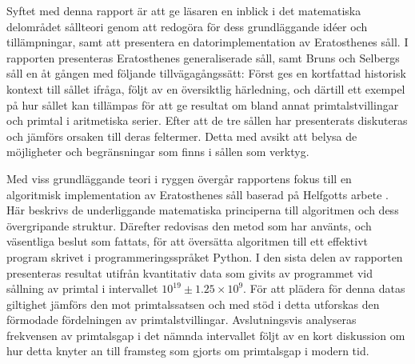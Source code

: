 Syftet med denna rapport är att ge läsaren en inblick i det matematiska delområdet sållteori genom att redogöra för dess grundläggande idéer och tillämpningar,
samt att presentera en datorimplementation av Eratosthenes såll.
%
I rapporten presenteras Eratosthenes generaliserade såll,
samt Bruns och Selbergs såll en åt gången med följande tillvägagångssätt:
Först ges en kortfattad historisk kontext till sållet ifråga,
följt av en översiktlig härledning,
och därtill ett exempel på hur sållet kan tillämpas
för att ge resultat om bland annat primtalstvillingar och primtal i aritmetiska serier.
%
Efter att de tre sållen har presenterats diskuteras och jämförs orsaken till deras feltermer.
Detta med avsikt att belysa de möjligheter och begränsningar som finns i sållen som verktyg.
%

%
Med viss grundläggande teori i ryggen  %
övergår rapportens fokus till en algoritmisk implementation av Eratosthenes såll baserad på Helfgotts arbete \cite{HaraldSieve}.
%
Här beskrivs de underliggande matematiska principerna till algoritmen och dess övergripande struktur. 
Därefter redovisas den metod som har använts, och väsentliga beslut som fattats,
för att översätta algoritmen till ett effektivt program skrivet i programmeringsspråket Python.
%
I den sista delen av rapporten presenteras resultat utifrån kvantitativ data som givits av programmet vid sållning av primtal i intervallet \(10^{19}\pm 1.25\times10^9\).
För att plädera för denna datas giltighet jämförs den mot primtalssatsen och med stöd i detta utforskas den förmodade fördelningen av primtalstvillingar.
Avslutningsvis analyseras frekvensen av primtalsgap i det nämnda intervallet följt av en kort diskussion om hur detta knyter an till framsteg som gjorts om primtalsgap i modern tid.


 


  



